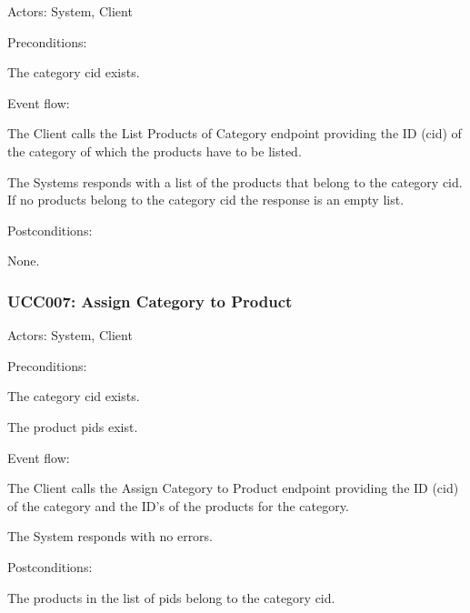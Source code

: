 Actors: System, Client

Preconditions:

\ucitem The category cid exists.

Event flow:

\ucitem The Client calls the List Products of Category endpoint providing the ID (cid) of the category of which the products have to be listed.

\ucitem The Systems responds with a list of the products that belong to the category cid. If no products belong to the category cid the response is an empty list.

Postconditions:

\ucitem None.

\subsubsection{UCC007: Assign Category to Product}
\label{UCC007}

Actors: System, Client

Preconditions:

\ucitem The category cid exists.

\ucitem The product pids exist.

Event flow:

\ucitem The Client calls the Assign Category to Product endpoint providing the ID (cid) of the category and the ID’s of the products for the category.

\ucitem The System responds with no errors.

Postconditions:

\ucitem The products in the list of pids belong to the category cid.
